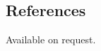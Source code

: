\documentclass[mm]{simple_style}
\begin{document}
\begin{resume}
\vspace{-2ex}
\sectionline

\section{References}

Available on request.

\vspace{-2ex}
\sectionline

\vfill
\hfill \color{mgray}{Last updated on \today}


\end{resume}
\end{document}
